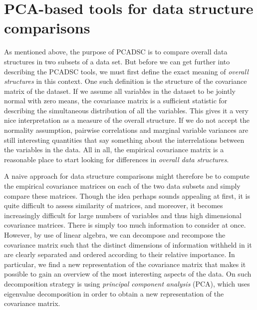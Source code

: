 \documentclass[titlepage,11pt,twoside]{article}
\begin{document}
\section{PCA-based tools for data structure comparisons}
\label{sec:pcadscintro}
As mentioned above, the purpose of PCADSC is to compare overall data structures in two subsets of a data set. But before we can get further into describing the PCADSC tools, we must first define the exact meaning of \textit{overall structures} in this context. One such definition is the structure of the covariance matrix of the dataset. If we assume all variables in the dataset to be jointly normal with zero means, the covariance matrix is a sufficient statistic for describing the simultaneous distribution of all the variables. This gives it a very nice interpretation as a measure of the overall structure. If we do not accept the normality assumption, pairwise correlations and marginal variable variances are still interesting quantities that say something about the interrelations between the variables in the data. All in all, the empirical covariance matrix is a reasonable place to start looking for differences in \textit{overall data structures}.

A naive approach for data structure comparisons might therefore be to compute the empirical covariance matrices on each of the two data subsets and simply compare these matrices. Though the idea perhaps sounds appealing at first, it is quite difficult to assess similarity of matrices, and moreover, it becomes increasingly difficult for large numbers of variables and thus high dimensional covariance matrices. There is simply too much information to consider at once. However, by use of linear algebra, we can decompose and recompose the covariance matrix such that the distinct dimensions of information withheld in it are clearly separated and ordered according to their relative importance. In particular, we find a new representation of the covariance matrix that makes it possible to gain an overview of the most interesting aspects of the data. On such decomposition strategy is using \textit{principal component analysis} (PCA), which uses eigenvalue decomposition in order to obtain a new representation of the covariance matrix.
\end{document}
